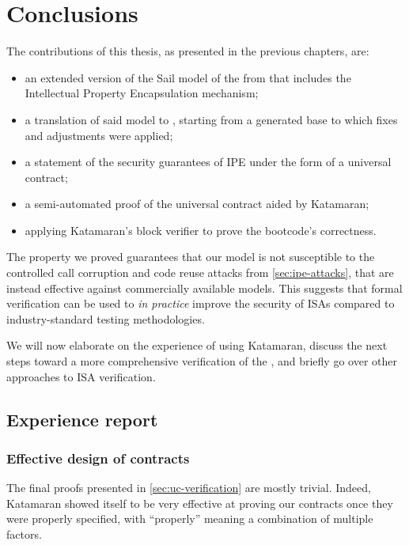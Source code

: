 \chapter{Conclusions}

The contributions of this thesis, as presented in the previous chapters, are:
\begin{itemize}
\item an extended version of the Sail model of the \msp from \cite{mspthesis} that includes the Intellectual Property Encapsulation mechanism;
\item a translation of said model to \usail, starting from a generated base to which fixes and adjustments were applied;
\item a statement of the security guarantees of IPE under the form of a universal contract;
\item a semi-automated proof of the universal contract aided by Katamaran;
\item applying Katamaran's block verifier to prove the \msp bootcode's correctness.
\end{itemize}

The property we proved guarantees that our model is not susceptible to the controlled call corruption and code reuse attacks from \cref{sec:ipe-attacks}, that are instead effective against commercially available \msp models. This suggests that formal verification can be used to \emph{in practice} improve the security of ISAs compared to industry-standard testing methodologies. %

We will now elaborate on the experience of using Katamaran, discuss the next steps toward a more comprehensive verification of the \msp, and briefly go over other approaches to ISA verification.

\section{Experience report}

\subsection{Effective design of contracts}

The final proofs presented in \cref{sec:uc-verification} are mostly trivial. Indeed, Katamaran showed itself to be very effective at proving our contracts once they were properly specified, with ``properly'' meaning a combination of multiple factors.

